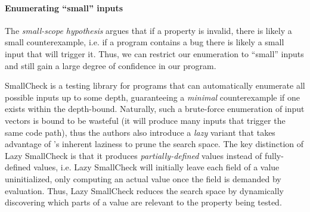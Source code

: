\paragraph{Enumerating ``small'' inputs}
The \emph{small-scope hypothesis} \cite{jackson_software_2006} argues
that if a property is invalid, there is likely a small counterexample,
i.e. if a program contains a bug there is likely a small input that will
trigger it. Thus, we can restrict our enumeration to ``small'' inputs
and still gain a large degree of confidence in our program.

SmallCheck \cite{runciman_smallcheck_2008} is a testing library for
\haskell programs
that can automatically
enumerate all possible inputs up to some depth, guaranteeing a
\emph{minimal} counterexample if one exists within the depth-bound.
%
Naturally, such a brute-force enumeration of input vectors is bound to
be wasteful (\ie it will produce many inputs that trigger the same code
path), thus the authors also introduce a \emph{lazy} variant that takes
advantage of \haskell's inherent laziness to prune the search space.
%
The key distinction of Lazy SmallCheck is that it produces
\emph{partially-defined} values instead of fully-defined values,
i.e. Lazy SmallCheck will initially leave each field of a value
uninitialized,
%
only computing an actual value once the field is demanded by
evaluation.
Thus, Lazy SmallCheck reduces the search space by
dynamically discovering which parts of a value are relevant to the
property being tested.
%
%

